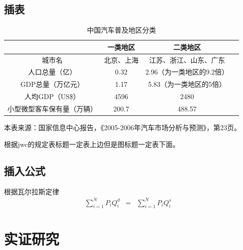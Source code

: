 \documentclass[12pt]{ctexart}
\begin{document}
\subsection{插表}
\begin{table}[H]
  \centering 
  \caption{中国汽车普及地区分类}\label{ }
  \vspace{.5em}
  \begin{tabular}{|c|c|c|c|}
\hline
   & 一类地区 &  二类地区\\\hline
 城市名  & 北京、上海 & 江苏、浙江、山东、广东 \\\hline
  人口总量（亿） & 0.32 & 2.96（为一类地区的9.2倍） \\\hline
  GDP总量（万亿元） & 1.17 & 5.83（为一类地区的5倍） \\\hline
人均GDP（US\$） & 4596 & 2480 \\\hline
小型微型客车保有量（万辆） & 200.7 & 488.57 \\\hline
\end{tabular}

\vspace{.5em}
本表来源：国家信息中心报告，《2005-2006年汽车市场分析与预测》，第23页。
\end{table}
根据jwc的规定表标题一定表上边但是图标题一定表下面。
\subsection{插入公式}
根据瓦尔拉斯定律
\begin{eqnarray}
\sum_{i=1}^N P_iQ_i^d & = & \sum_{i=1}^N P_iQ_i^s 
\end{eqnarray}
\section{实证研究}
\end{document}
